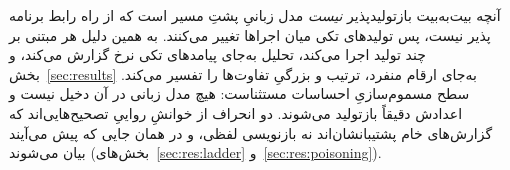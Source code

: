 آنچه بیت‌به‌بیت بازتولیدپذیر \emph{نیست} مدل زبانیِ پشتِ مسیر 
است که از راه رابط برنامه پذیر نیست، پس تولیدهای تکی میان
اجراها تغییر می‌کنند. به همین دلیل هر  مبتنی بر  چند
تولید اجرا می‌کند، تحلیل به‌جای پیامدهای تکی نرخ گزارش می‌کند، و
بخش~\ref{sec:results} به‌جای ارقام منفرد، ترتیب و بزرگیِ تفاوت‌ها را
تفسیر می‌کند. سطح مسموم‌سازیِ احساسات مستثناست: هیچ مدل زبانی در آن دخیل
نیست و اعدادش دقیقاً بازتولید می‌شوند. دو انحراف از خوانشِ رواییِ
\cite{pwnzzdocsres} تصحیح‌هایی‌اند که گزارش‌های خام پشتیبانشان‌اند نه
بازنویسی لفظی، و در همان جایی که پیش می‌آیند بیان می‌شوند
(بخش‌های~\ref{sec:res:ladder} و~\ref{sec:res:poisoning}).
